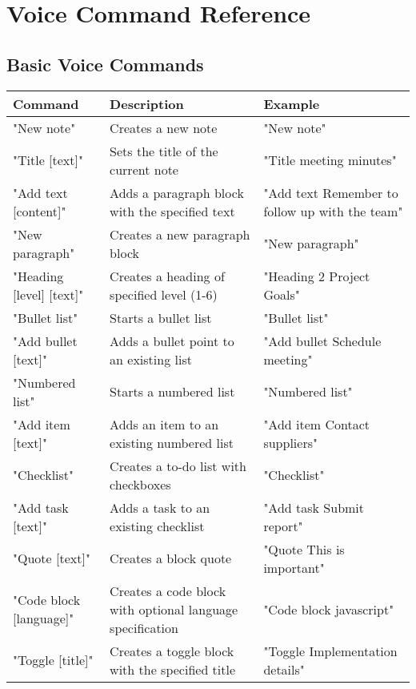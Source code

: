 
\chapter{Voice Command Reference}

\section{Basic Voice Commands}

\begin{longtable}{p{}p{}p{}}
\toprule
\textbf{Command} & \textbf{Description} & \textbf{Example} \\
\midrule
\endhead

"New note" & Creates a new note & "New note" \\
"Title [text]" & Sets the title of the current note & "Title meeting minutes" \\
"Add text [content]" & Adds a paragraph block with the specified text & "Add text Remember to follow up with the team" \\
\midrule

"New paragraph" & Creates a new paragraph block & "New paragraph" \\
"Heading [level] [text]" & Creates a heading of specified level (1-6) & "Heading 2 Project Goals" \\
"Bullet list" & Starts a bullet list & "Bullet list" \\
"Add bullet [text]" & Adds a bullet point to an existing list & "Add bullet Schedule meeting" \\
"Numbered list" & Starts a numbered list & "Numbered list" \\
"Add item [text]" & Adds an item to an existing numbered list & "Add item Contact suppliers" \\
"Checklist" & Creates a to-do list with checkboxes & "Checklist" \\
"Add task [text]" & Adds a task to an existing checklist & "Add task Submit report" \\
"Quote [text]" & Creates a block quote & "Quote This is important" \\
"Code block [language]" & Creates a code block with optional language specification & "Code block javascript" \\
"Toggle [title]" & Creates a toggle block with the specified title & "Toggle Implementation details" \\
\midrule


\end{longtable}
